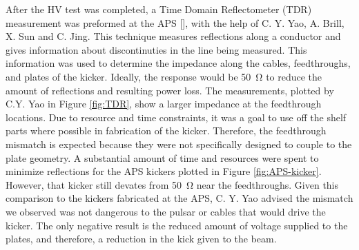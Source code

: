 After the HV test was completed, a Time Domain Reflectometer (TDR) measurement was preformed at the APS [], 
with the help of C. Y. Yao, A. Brill, X. Sun and C. Jing.
This technique measures reflections along a conductor and gives information about discontinuties in the line being measured. 
This information was used to determine the impedance along the cables, feedthroughs, and plates of the kicker. 
Ideally, the response would be \SI{50}{\ohm} to reduce the amount of reflections and resulting power loss. 
The measurements, plotted by C.Y. Yao in Figure \ref{fig:TDR}, show a larger impedance at the feedthrough locations.
Due to resource and time constraints, it was a goal to use off the shelf parts where possible in fabrication of the kicker.
Therefore, the feedthrough mismatch is expected because they were not specifically designed to couple to the plate geometry.
A substantial amount of time and resources were spent to minimize reflections for the APS kickers plotted in Figure \ref{fig:APS-kicker}.
However, that kicker still devates from \SI{50}{\ohm} near the feedthroughs.
Given this comparison to the kickers fabricated at the APS, C. Y. Yao advised the mismatch we observed was not dangerous to 
the pulsar or cables that would drive the kicker.  
The only negative result is the reduced amount of voltage supplied to the plates, and therefore, a reduction in the kick given to the beam.
